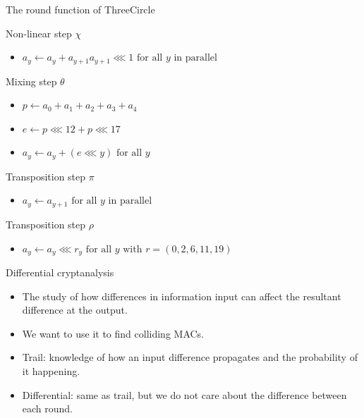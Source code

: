 \documentclass{beamer}
\begin{document}
\begin{frame}{The round function of ThreeCircle}
\begin{block}{Non-linear step $\chi$}
\begin{itemize}
    \item $a_y \leftarrow a_y + a_{y+1}a_{y+1}\lll 1 \text{ for all } y \text{ in parallel}$
\end{itemize}
\end{block}
\begin{block}{Mixing step $\theta$}
\begin{itemize}
    \item $p \leftarrow a_0 + a_1 + a_2 + a_3 + a_4$
    \item $e \leftarrow p \lll 12 + p \lll 17$
    \item $a_y \leftarrow a_y + (e \lll y) \text{ for all } y$
\end{itemize}
\end{block}
\begin{block}{Transposition step $\pi$}
\begin{itemize}
    \item $a_y \leftarrow a_{y+1} \text{ for all } y \text{ in parallel}$
\end{itemize}
\end{block}
\begin{block}{Transposition step $\rho$}
\begin{itemize}
\item $a_y \leftarrow a_y \lll r_y \text{ for all } y \text{ with } r = (0, 2, 6, 11, 19)$
\end{itemize}
\end{block}
\end{frame}
 
\begin{frame}{Differential cryptanalysis}
\begin{itemize}
    \item The study of how differences in information input can affect the resultant difference at the output.
    \item We want to use it to find colliding MACs.
    \item Trail: knowledge of how an input difference propagates and the probability of it happening.
    \item Differential: same as trail, but we do not care about the difference between each round.
\end{itemize}
\end{frame}
\end{document}
